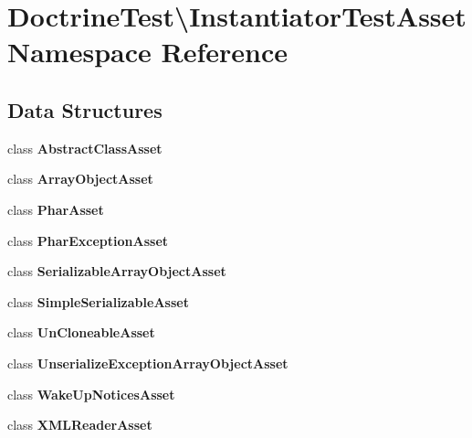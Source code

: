 \section{Doctrine\+Test\textbackslash{}Instantiator\+Test\+Asset Namespace Reference}
\label{namespace_doctrine_test_1_1_instantiator_test_asset}
\subsection*{Data Structures}
\begin{DoxyCompactItemize}
\item 
class {\bf Abstract\+Class\+Asset}
\item 
class {\bf Array\+Object\+Asset}
\item 
class {\bf Phar\+Asset}
\item 
class {\bf Phar\+Exception\+Asset}
\item 
class {\bf Serializable\+Array\+Object\+Asset}
\item 
class {\bf Simple\+Serializable\+Asset}
\item 
class {\bf Un\+Cloneable\+Asset}
\item 
class {\bf Unserialize\+Exception\+Array\+Object\+Asset}
\item 
class {\bf Wake\+Up\+Notices\+Asset}
\item 
class {\bf X\+M\+L\+Reader\+Asset}
\end{DoxyCompactItemize}

